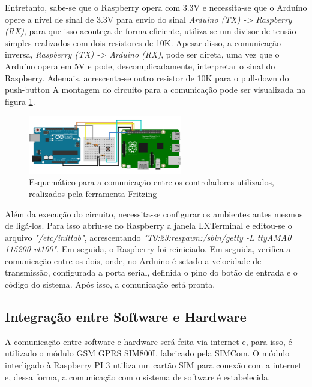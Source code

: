 Entretanto, sabe-se que o Raspberry opera com 3.3V e necessita-se que o Arduíno opere a nível de sinal de 3.3V para envio do sinal \textit{Arduino (TX) -> Raspberry (RX)}, para que isso aconteça de forma eficiente, utiliza-se um divisor de tensão simples realizados com dois resistores de 10K. Apesar disso, a comunicação inversa, \textit{Raspberry (TX) -> Arduino (RX)}, pode ser direta, uma vez que o Arduíno opera em 5V e pode, descomplicadamente, interpretar o sinal do Raspberry. Ademais, acrescenta-se outro resistor de 10K para o pull-down do push-button A montagem do circuito para a comunicação pode ser visualizada na figura \ref{fig:comunicacao_rasp_arduino}.

\begin{figure}[H]
\centering
\includegraphics[width=0.6\textwidth]{figuras/comunicacao_rasp_arduino}
 \caption{Esquemático para a comunicação entre os controladores utilizados, realizados pela ferramenta Fritzing}
\label{fig:comunicacao_rasp_arduino}
\end{figure}

Além da execução do circuito, necessita-se configurar os ambientes antes mesmos de ligá-los. Para isso abriu-se no Raspberry a janela LXTerminal e editou-se o arquivo \textit{"/etc/inittab"}, acrescentando \textit{"T0:23:respawn:/sbin/getty -L ttyAMA0 115200 vt100"}. Em seguida, o Raspberry foi reiniciado.
Em seguida, verifica a comunicação entre os dois, onde, no Arduino é setado a velocidade de transmissão, configurada a porta serial, definida o pino do botão de entrada e o código do sistema. Após isso, a comunicação está pronta.


\subsection{Integração entre Software e Hardware}
A comunicação entre software e hardware será feita via internet e, para isso, é utilizado o módulo GSM GPRS SIM800L fabricado pela SIMCom. O módulo interligado à Raspberry PI 3 utiliza um cartão SIM para conexão com a internet e, dessa forma, a comunicação com o sistema de software é estabelecida.

